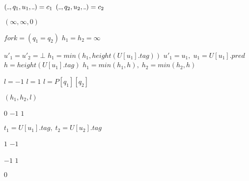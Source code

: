 \documentclass[AMA,STIX1COL]{WileyNJD-v2}
\newcommand{\Xund}{\rule{.4em}{.4pt}}
\begin{document}
\begin{algorithm}[H] \DontPrintSemicolon {} 
\begin{multicols}{2}

     {
        $(\Xund, q_1, u_1, \Xund) = c_1$ \;
        $(\Xund, q_2, u_2, \Xund) = c_2$ \;

         {
            \Return $(\infty, \infty, 0)$
        }

        \BlankLine
        $f\!ork = (q_1 = q_2)$ \;
         {
            $h_1 = h_2 = \infty$
        }

        \BlankLine
        $u'_1 = u'_2 = \bot$ \;
         {
             {
                $h_1 = min(h_1, height(U[u_1].tag))$ \;
                $u'_1 = u_1, \; u_1 = U[u_1].pred$ \;
            }
        }
         {
            $h = height(U[u_1].tag)$ \;
            $h_1 = min(h_1, h), \; h_2 = min(h_2, h)$ \;
        }

        \BlankLine
            {$l = -1$}
            {$l = 1$ }
          {$l = P[q_1][q_2]$}

        \BlankLine
        \Return $(h_1, h_2, l)$ \;
    }
    \BlankLine
    \BlankLine

     {

         { \Return $0$ }
         { \Return $-1$ }
         { \Return $1$ }

        \BlankLine
        $t_1 = U[u_1].tag, \; t_2 = U[u_2].tag$ \;

        \BlankLine
         { \Return $1$ }
         { \Return $-1$ }

        \BlankLine
         { \Return $-1$ }
         { \Return $1$ }

        \BlankLine
        \Return $0$
    }
    \BlankLine
    \BlankLine


\end{multicols}
\end{algorithm}
\end{document}
